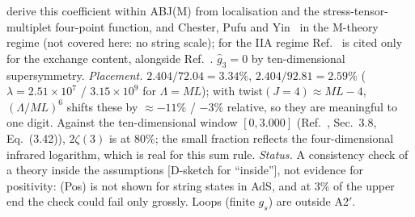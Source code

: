 \documentclass[aps,prl,onecolumn,superscriptaddress,nofootinbib]{revtex4-2}
\begin{document}
derive this coefficient within ABJ(M) from localisation and the stress-tensor-multiplet four-point function, and
Chester, Pufu and Yin~\cite{CPY} in the M-theory regime (not covered here: no string scale); for the IIA regime
Ref.~\cite{CPY} is cited only for the exchange content, alongside Ref.~\cite{BCP}. $\hat g_3=0$ by
ten-dimensional supersymmetry. \emph{Placement.} $2.404/72.04=3.34\%$, $2.404/92.81=2.59\%$ ($\lambda=2.51\times10^7$ / $3.15\times10^9$ for $\Lambda=ML$); with twist$(J=4)\approx ML-4$, $(\Lambda/ML)^6$ shifts these by $\approx-11\%$ / $-3\%$ relative, so they are
meaningful to one digit. Against the ten-dimensional window $[0,3.000]$ (Ref.~\cite{CHMRSswamp}, Sec.~3.8, Eq.~(3.42)), $2\zeta(3)$ is at $80\%$; the small
fraction reflects the four-dimensional infrared logarithm, which is real for this sum rule. \emph{Status.} A
consistency check of a theory inside the assumptions [D-sketch for ``inside''], not evidence for positivity: (Pos)
is not shown for string states in AdS, and at $3\%$ of the upper end the check could fail only grossly. Loops
(finite $g_s$) are outside A2$'$.
\end{document}
